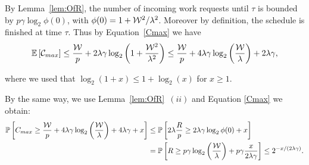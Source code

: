 \begin{pf}
\label{proof_cmax}
  By Lemma~\ref{lem:OfR}, the number of
  incoming work requests until $\tau$ is bounded by
  $p\gamma\log_2\phi(0)$, with $\phi(0)=1+\mathcal{W}^2/\lambda^2$. Moreover
  by definition, the schedule is finished at time $\tau$. Thus by
  Equation~\eqref{Cmax} we have
  \begin{align*}
    \esp{\mathcal{C}_{max}}  \leq \frac{\calW}{p} + 2\lambda
                               \gamma\log_2\left(1+\frac{\calW^2}{\lambda^2}\right)
                              \leq \frac{\calW}{p} + 4\lambda\gamma\log_2\left(\frac{\mathcal{W}}{\lambda}\right) + 2\lambda\gamma,
  \end{align*}
  
  where we used that $\log_2(1+x)\le1+\log_2(x)$ for $x\ge1$.
  
  By the same way, we use Lemma~\ref{lem:OfR}~$(ii)$ and Equation
  \ref{Cmax} we obtain:
  \begin{align*}
      \Proba{ C_{max}  \ge \frac{\mathcal{W}}{p} + 
    4\lambda\gamma\log_2\left(\frac{\mathcal{W}}{\lambda}\right)+4\lambda\gamma+x}
    &\le \Proba{2\lambda \frac{R}{p} \ge
      2\lambda\gamma\log_2\phi(0)+ x}\\
    &=\Proba{R \ge 
      p\gamma \log_2\left(\frac{\mathcal{W}}{\lambda}\right)+p\gamma
      \frac{x}{2\lambda\gamma}}\le {2}^{-x/(2\lambda\gamma)}.
  \end{align*}
\end{pf}

%



